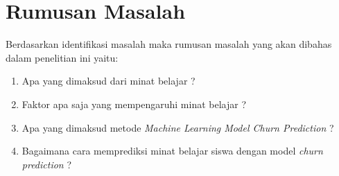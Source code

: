 \section{Rumusan Masalah}

Berdasarkan identifikasi masalah maka rumusan masalah yang akan dibahas dalam penelitian ini yaitu:
\begin{enumerate}

    \item Apa yang dimaksud dari minat belajar ?
    \item Faktor apa saja yang mempengaruhi minat belajar ?
    \item Apa yang dimaksud metode \textit {Machine Learning Model Churn Prediction} ?
    \item Bagaimana cara memprediksi minat belajar siswa dengan model \textit{churn prediction } ?
    
\end{enumerate}